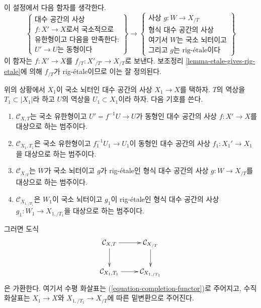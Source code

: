 \medskip\noindent
이 설정에서 다음 함자를 생각한다.
\begin{equation}
\label{equation-completion-functor}
\left\{
\begin{matrix}
\text{대수 공간의 사상}\\
f : X' \to X\text{로서 국소적으로}\\
\text{유한형이고 다음을 만족한다:}\\
U' \to U\text{는 동형이다}
\end{matrix}
\right\}
\longrightarrow
\left\{
\begin{matrix}
\text{사상 }g : W \to X_{/T}\\
\text{형식 대수 공간의 사상}\\
\text{여기서 }W\text{는 국소 뇌터이고}\\
\text{그리고 }g\text{는 rig-\'etale이다}
\end{matrix}
\right\}
\end{equation}
이 함자는 $f : X' \to X$를
$f_{/T} : X'_{/T'} \to X_{/T}$로 보낸다.
보조정리 \ref{lemma-etale-gives-rig-etale}에 의해
$f_{/T}$가 rig-\'etale이므로 이는 잘 정의된다.

\begin{lemma}
\label{lemma-functoriality-completion-functor}
위의 상황에서 $X_1$이 국소 뇌터인 대수 공간의 사상
$X_1 \to X$를 택하자. $T$의 역상을
$T_1 \subset |X_1|$라 하고 $U$의 역상을
$U_1 \subset X_1$이라 하자. 다음 기호를 쓴다.
\begin{enumerate}
\item $\mathcal{C}_{X, T}$는 국소 유한형이고
$U' = f^{-1}U \to U$가 동형인 대수 공간의 사상
$f : X' \to X$를 대상으로 하는 범주이다.
\item $\mathcal{C}_{X_1, T_1}$은 국소 유한형이고
$f_1^{-1}U_1 \to U_1$이 동형인 대수 공간의 사상
$f_1 : X_1' \to X_1$을 대상으로 하는 범주이다.
\item $\mathcal{C}_{X_{/T}}$는 $W$가 국소 뇌터이고
$g$가 rig-\'etale인 형식 대수 공간의 사상
$g : W \to X_{/T}$를 대상으로 하는 범주이다.
\item $\mathcal{C}_{X_{1, /T_1}}$은 $W_1$이 국소 뇌터이고
$g_1$이 rig-\'etale인 형식 대수 공간의 사상
$g_1 : W_1 \to X_{1, /T_1}$을 대상으로 하는 범주이다.
\end{enumerate}
그러면 도식
$$
\xymatrix{
\mathcal{C}_{X, T} \ar[d] \ar[r] &
\mathcal{C}_{X_{/T}} \ar[d] \\
\mathcal{C}_{X_1, T_1} \ar[r] &
\mathcal{C}_{X_{1, /T_1}}
}
$$
은 가환한다. 여기서 수평 화살표는
(\ref{equation-completion-functor})로 주어지고,
수직 화살표는 $X_1 \to X$와
$X_{1, /T_1} \to X_{/T}$에 따른 밑변환으로 주어진다.
\end{lemma}

